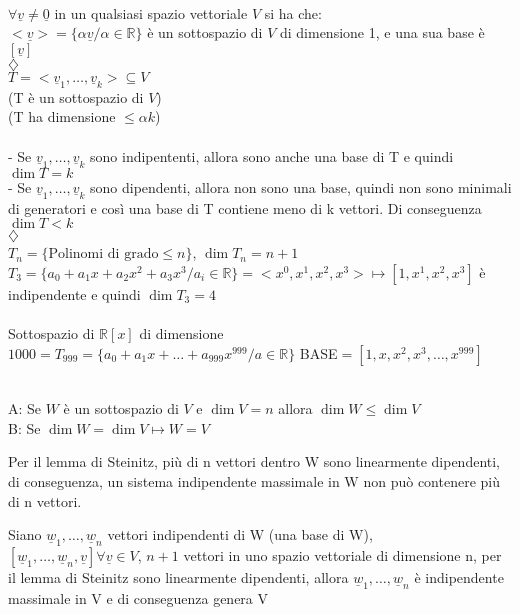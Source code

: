 \begin{proposizione}
	\phantom{text}\\
	$\forall\underline{v}\neq\underline{0}$ in un qualsiasi spazio  vettoriale $V$ si ha che:\\
	$<\underline{v}>=\{\alpha\underline{v}/\alpha\in\mathbb{R}\}$ è un sottospazio di $V$ di dimensione 1, e una sua base è $[\underline{v}]$\\$\diamondsuit$\\
	$T=<\underline{v}_1,\dots,\underline{v}_k>\subseteq V$\\
	(T è un sottospazio di $V$)\\
	(T ha dimensione $\leqslant\alpha k$)\\\\
	- Se $\underline{v}_1,\dots,\underline{v}_k$ sono indipententi, allora sono anche una base di T e quindi $\dim T=k$\\
	- Se $\underline{v}_1,\dots,\underline{v}_k$ sono dipendenti, allora non sono una base, quindi non sono minimali di generatori e così una base di T contiene meno di k vettori. Di conseguenza $\dim T<k$\\$\diamondsuit$\\
	$T_n=\{\text{Polinomi di grado}\leqslant n\}$, $\dim T_n=n+1$\\
	$T_3=\{a_0+a_1 x+a_2 x^2+a_3 x^3/a_i\in\mathbb{R}\}=<x^0,x^1,x^2,x^3>\mapsto[1,x^1,x^2,x^3]$ è indipendente e quindi $\dim T_3=4$\\\\
	Sottospazio di $\mathbb{R}[x]$ di dimensione $1000=T_{999}=\{a_0+a_1 x+\dots+a_{999}x^{999}/a\in\mathbb{R}\}$ BASE$=[1,x,x^2,x^3,\dots,x^{999}]$
\end{proposizione}

\begin{proposizione}
	\phantom{text}\\
	A: Se $W$ è un sottospazio di $V$ e $\dim V=n$ allora $\dim W\leqslant\dim V$\\
	B: Se $\dim W=\dim V\mapsto W=V$
	\begin{dimostrazione}[A]
		Per il lemma di Steinitz, più di n vettori dentro W sono linearmente dipendenti, di conseguenza, un sistema indipendente massimale in W non può contenere più di n vettori.
	\end{dimostrazione}
	\begin{dimostrazione}[B]
		Siano $\underline{w}_1,\dots,\underline{w}_n$ vettori indipendenti di W (una base di W), \\$[\underline{w}_1,\dots,\underline{w}_n,\underline{v}]\forall\underline{v}\in V$, $n+1$ vettori in uno spazio vettoriale di dimensione n, per il lemma di Steinitz sono linearmente dipendenti, allora $\underline{w}_1,\dots,\underline{w}_n$ è indipendente massimale in V e di conseguenza genera V
	\end{dimostrazione}
\end{proposizione}


